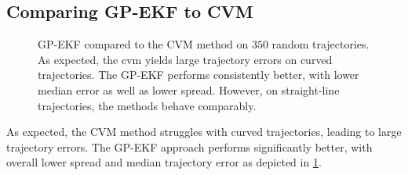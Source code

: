 \subsection{Comparing GP-EKF to CVM}
\begin{figure}[h]
    \centering
    \caption{GP-EKF compared to the CVM method on $350$ random trajectories. As expected, the \acrshort{cvm} yields large trajectory errors on curved trajectories. The GP-EKF performs consistently better, with lower median error as well as lower spread. However, on straight-line trajectories, the methods behave comparably.}
    \label{fig:stats_curved_gp_ekf_cvm}
\end{figure}
As expected, the CVM method struggles with curved trajectories, leading to large trajectory errors. The GP-EKF approach performs significantly better, with overall lower spread and median trajectory error as depicted in \cref{fig:stats_curved_gp_ekf_cvm}.

